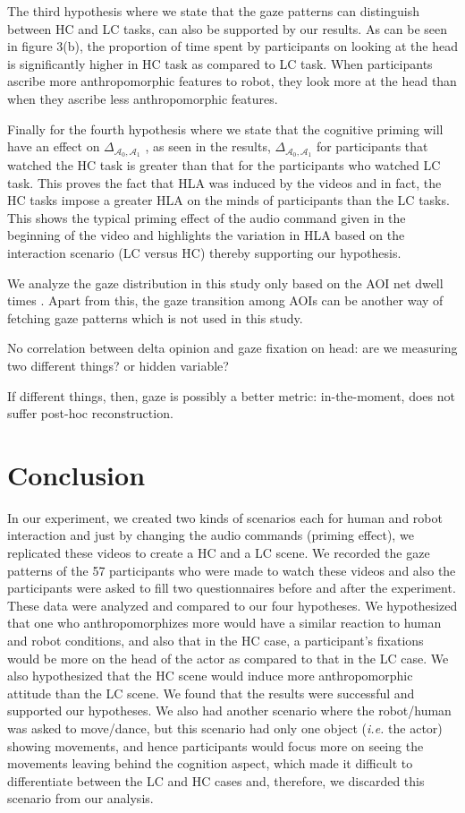 \documentclass[lettersize, noapacite, twoside, HRI]{apa_HRI}
\newcommand{\ie}{\textit{i.e.}\xspace}
\newcommand{\deltaant}{{ $\Delta_{\mathcal{A}_0,\mathcal{A}_1}$ }}
\begin{document}
The third hypothesis where we state that the gaze patterns can distinguish
between HC and LC tasks, can also be supported by our results. As can be seen in
figure 3(b), the proportion of time spent by participants on looking at the head
is significantly higher in HC task as compared to LC task. When participants
ascribe more anthropomorphic features to robot, they look more at the head than
when they ascribe less anthropomorphic features.

Finally for the fourth hypothesis where we state that the cognitive priming will
have an effect on \deltaant, as seen in the results, \deltaant
for participants that watched the HC task is greater than that for the
participants who watched LC task. This proves the fact that HLA was induced by
the videos and in fact, the HC tasks impose a greater HLA on the minds of
participants than the LC tasks. This shows the typical priming effect of the
audio command given in the beginning of the video and highlights the variation
in HLA based on the interaction scenario (LC versus HC) thereby supporting our
hypothesis. 

We analyze the gaze distribution in this study only based on the AOI net dwell
times . Apart from this, the gaze transition among AOIs can be another way of
fetching gaze patterns which is not used in this study.


No correlation between delta opinion and gaze fixation on head: are we measuring
two different things? or hidden variable?

If different things, then, gaze is possibly a better metric: in-the-moment, does
not suffer post-hoc reconstruction.


\section{Conclusion}

In our experiment, we created two kinds of scenarios each for human and
robot interaction and just by changing the audio commands (priming
effect), we replicated these videos to create a HC and a LC scene. We recorded
the gaze patterns of the 57 participants who were made to watch these videos and
also the participants were asked to fill two questionnaires before and after the
experiment. These data were analyzed and compared to our four hypotheses. We
hypothesized that one who anthropomorphizes more would have a similar reaction
to human and robot conditions, and also that in the HC case, a
participant's fixations would be more on the head of the actor as compared to
that in the LC case. We also hypothesized that the HC scene would induce more
anthropomorphic attitude than the LC scene. We found that the results were
successful and supported our hypotheses. We also had another scenario where the
robot/human was asked to move/dance, but this scenario had only one object
(\ie the actor) showing movements, and hence participants would focus
more on seeing the movements leaving behind the cognition aspect, which made it
difficult to differentiate between the LC and HC cases and, therefore, we
discarded this scenario from our analysis.
\end{document}
